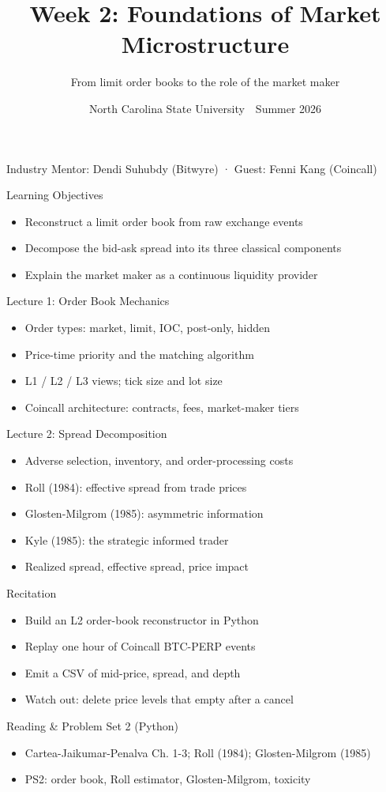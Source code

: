 \documentclass[aspectratio=169,11pt]{beamer}
\title{Week 2: Foundations of Market Microstructure}
\subtitle{From limit order books to the role of the market maker}
\date{North Carolina State University \,\textbar\, Summer 2026}
\begin{document}
\begin{frame}[plain]\titlepage
\begin{center}\tiny Industry Mentor: Dendi Suhubdy (Bitwyre)  ·  Guest: Fenni Kang (Coincall)\end{center}\end{frame}
\begin{frame}{Learning Objectives}
\begin{itemize}
  \item Reconstruct a limit order book from raw exchange events
  \item Decompose the bid-ask spread into its three classical components
  \item Explain the market maker as a continuous liquidity provider
\end{itemize}\end{frame}
\begin{frame}{Lecture 1: Order Book Mechanics}
\begin{itemize}
  \item Order types: market, limit, IOC, post-only, hidden
  \item Price-time priority and the matching algorithm
  \item L1 / L2 / L3 views; tick size and lot size
  \item Coincall architecture: contracts, fees, market-maker tiers
\end{itemize}\end{frame}
\begin{frame}{Lecture 2: Spread Decomposition}
\begin{itemize}
  \item Adverse selection, inventory, and order-processing costs
  \item Roll (1984): effective spread from trade prices
  \item Glosten-Milgrom (1985): asymmetric information
  \item Kyle (1985): the strategic informed trader
  \item Realized spread, effective spread, price impact
\end{itemize}\end{frame}
\begin{frame}{Recitation}
\begin{itemize}
  \item Build an L2 order-book reconstructor in Python
  \item Replay one hour of Coincall BTC-PERP events
  \item Emit a CSV of mid-price, spread, and depth
  \item Watch out: delete price levels that empty after a cancel
\end{itemize}\end{frame}
\begin{frame}{Reading \& Problem Set 2 (Python)}
\begin{itemize}
  \item Cartea-Jaikumar-Penalva Ch. 1-3; Roll (1984); Glosten-Milgrom (1985)
  \item PS2: order book, Roll estimator, Glosten-Milgrom, toxicity
\end{itemize}\end{frame}
\end{document}
